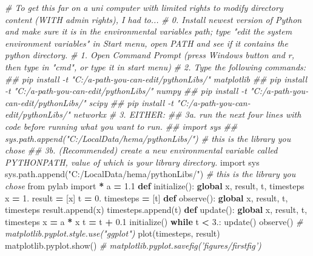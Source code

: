 \documentclass[]{article}
\newenvironment{Shaded}{\begin{snugshade}}{\end{snugshade}}
\newcommand{\KeywordTok}[1]{\textcolor[rgb]{0.13,0.29,0.53}{\textbf{#1}}}
\newcommand{\DecValTok}[1]{\textcolor[rgb]{0.00,0.00,0.81}{#1}}
\newcommand{\FloatTok}[1]{\textcolor[rgb]{0.00,0.00,0.81}{#1}}
\newcommand{\StringTok}[1]{\textcolor[rgb]{0.31,0.60,0.02}{#1}}
\newcommand{\ImportTok}[1]{#1}
\newcommand{\CommentTok}[1]{\textcolor[rgb]{0.56,0.35,0.01}{\textit{#1}}}
\newcommand{\ControlFlowTok}[1]{\textcolor[rgb]{0.13,0.29,0.53}{\textbf{#1}}}
\newcommand{\OperatorTok}[1]{\textcolor[rgb]{0.81,0.36,0.00}{\textbf{#1}}}
\newcommand{\NormalTok}[1]{#1}
\begin{document}
\begin{Shaded}
\begin{Highlighting}[]
\CommentTok{# To get this far on a uni computer with limited rights to modify directory content (WITH admin rights), I had to...}
\CommentTok{# 0. Install newest version of Python and make sure it is in the environmental variables path; type "edit the system environment variables" in Start menu, open PATH and see if it contains the python directory.}
\CommentTok{# 1. Open Command Prompt (press Windows button and r, then type in "cmd", or type it in start menu)}
\CommentTok{# 2. Type the following commands: }
\CommentTok{## pip install -t "C:/a-path-you-can-edit/pythonLibs/" matplotlib}
\CommentTok{## pip install -t "C:/a-path-you-can-edit/pythonLibs/" numpy}
\CommentTok{## pip install -t "C:/a-path-you-can-edit/pythonLibs/" scipy}
\CommentTok{## pip install -t "C:/a-path-you-can-edit/pythonLibs/" networkx}
\CommentTok{# 3. EITHER: }
\CommentTok{## 3a. run the next four lines with code before running what you want to run.}
\CommentTok{## import sys}
\CommentTok{## sys.path.append("C:/LocalData/hema/pythonLibs/") # this is the library you chose}
\CommentTok{## 3b. (Recommended) create a new environmental variable called PYTHONPATH, value of which is your library directory. }
\ImportTok{import}\NormalTok{ sys}
\NormalTok{sys.path.append(}\StringTok{"C:/LocalData/hema/pythonLibs/"}\NormalTok{) }\CommentTok{# this is the library you chose}
\ImportTok{from}\NormalTok{ pylab }\ImportTok{import} \OperatorTok{*}
\NormalTok{a }\OperatorTok{=} \FloatTok{1.1}
\KeywordTok{def}\NormalTok{ initialize():}
    \KeywordTok{global}\NormalTok{ x, result, t, timesteps}
\NormalTok{    x }\OperatorTok{=} \DecValTok{1}\NormalTok{.}
\NormalTok{    result }\OperatorTok{=}\NormalTok{ [x]}
\NormalTok{    t }\OperatorTok{=} \DecValTok{0}\NormalTok{.}
\NormalTok{    timesteps }\OperatorTok{=}\NormalTok{ [t]}
\KeywordTok{def}\NormalTok{ observe():}
    \KeywordTok{global}\NormalTok{ x, result, t, timesteps}
\NormalTok{    result.append(x)}
\NormalTok{    timesteps.append(t)}
\KeywordTok{def}\NormalTok{ update():}
    \KeywordTok{global}\NormalTok{ x, result, t, timesteps}
\NormalTok{    x }\OperatorTok{=}\NormalTok{ a }\OperatorTok{*}\NormalTok{ x}
\NormalTok{    t }\OperatorTok{=}\NormalTok{ t }\OperatorTok{+} \FloatTok{0.1}
\NormalTok{initialize()}
\ControlFlowTok{while}\NormalTok{ t }\OperatorTok{<} \DecValTok{3}\NormalTok{.:}
\NormalTok{    update()}
\NormalTok{    observe()}
\CommentTok{# matplotlib.pyplot.style.use("ggplot")}
\NormalTok{plot(timesteps, result)}
\NormalTok{matplotlib.pyplot.show()}
\CommentTok{# matplotlib.pyplot.savefig('figures/firstfig')}
\end{Highlighting}
\end{Shaded}
\end{document}
